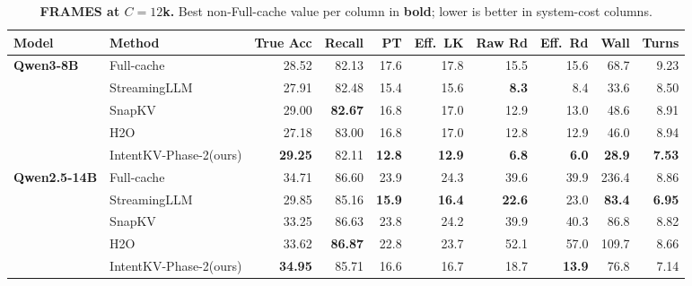 \documentclass[11pt]{article}
\newcommand{\method}{IntentKV\xspace}
\newcommand{\learn}{Phase-2\xspace}
\begin{document}
\begin{table}[!htbp]
\centering
\footnotesize
\caption{\textbf{FRAMES at \texorpdfstring{$C{=}12$k}{C=12k}.} Best
non-Full-cache value per column in \textbf{bold}; lower is better in
system-cost columns.}
\label{tab:frames-12k}
\setlength{\tabcolsep}{4pt}
\begin{tabular*}{\textwidth}{@{\extracolsep{\fill}} llrrrrrrrr}
\toprule
Model & Method & True Acc & Recall & PT & Eff.~LK & Raw Rd & Eff.~Rd & Wall & Turns \\
\midrule
\multirow{5}{*}{\textbf{Qwen3-8B}}
  & Full-cache                 & 28.52          & 82.13          & 17.6          & 17.8          & 15.5          & 15.6          & 68.7          & 9.23 \\
  & StreamingLLM               & 27.91          & 82.48          & 15.4          & 15.6          & \textbf{8.3}  & 8.4           & 33.6          & 8.50 \\
  & SnapKV                     & 29.00          & \textbf{82.67} & 16.8          & 17.0          & 12.9          & 13.0          & 48.6          & 8.91 \\
  & H2O                        & 27.18          & 83.00          & 16.8          & 17.0          & 12.8          & 12.9          & 46.0          & 8.94 \\
  & \method-\learn (ours)      & \textbf{29.25} & 82.11          & \textbf{12.8} & \textbf{12.9} & \textbf{6.8}  & \textbf{6.0}  & \textbf{28.9} & \textbf{7.53} \\
\midrule
\multirow{5}{*}{\textbf{Qwen2.5-14B}}
  & Full-cache                 & 34.71          & 86.60          & 23.9          & 24.3          & 39.6          & 39.9          & 236.4         & 8.86 \\
  & StreamingLLM               & 29.85          & 85.16          & \textbf{15.9} & \textbf{16.4} & \textbf{22.6} & 23.0          & \textbf{83.4} & \textbf{6.95} \\
  & SnapKV                     & 33.25          & 86.63          & 23.8          & 24.2          & 39.9          & 40.3          & 86.8          & 8.82 \\
  & H2O                        & 33.62          & \textbf{86.87} & 22.8          & 23.7          & 52.1          & 57.0          & 109.7         & 8.66 \\
  & \method-\learn (ours)      & \textbf{34.95} & 85.71          & 16.6          & 16.7          & 18.7          & \textbf{13.9} & 76.8          & 7.14 \\
\bottomrule
\end{tabular*}
\end{table}
\end{document}
